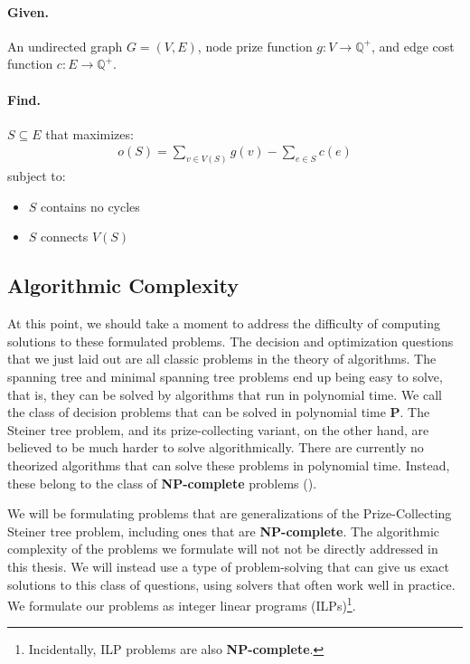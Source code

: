 \documentclass[12pt,twoside]{reedthesis}
\theoremstyle{definition}
\begin{document}
  \hfill\begin{minipage}{\dimexpr\textwidth-2cm}
  \paragraph{Given.}An undirected graph $G=(V,E)$, node prize function $g:V \rightarrow \mathbb{Q}^+$, and edge cost function $c:E \rightarrow \mathbb{Q}^+$.
  \paragraph{Find.}$S \subseteq E$ that maximizes:
  \begin{align*}
   o(S) = \sum_{v \in V(S)}g(v) - \sum_{e \in S}c(e)
  \end{align*}
  subject to:
  \begin{itemize}
    \item{$S$ contains no cycles}
    \item{$S$ connects $V(S)$}
  \end{itemize}
\xdef\tpd{\the\prevdepth}
\end{minipage}

\subsection{Algorithmic Complexity}
At this point, we should take a moment to address the difficulty of computing solutions to these formulated problems. The decision and optimization questions that we just laid out are all classic problems in the theory of algorithms. The spanning tree and minimal spanning tree problems end up being easy to solve, that is, they can be solved by algorithms that run in polynomial time. We call the class of decision problems that can be solved in polynomial time \textbf{P}. The Steiner tree problem, and its prize-collecting variant, on the other hand, are believed to be much harder to solve algorithmically. There are currently no theorized algorithms that can solve these problems in polynomial time. Instead, these belong to the class of \textbf{NP-complete} problems (\cite{Garey1979}).\par

We will be formulating problems that are generalizations of the Prize-Collecting Steiner tree problem, including ones that are \textbf{NP-complete}. The algorithmic complexity of the problems we formulate will not not be directly addressed in this thesis. We will instead use a type of problem-solving that can give us exact solutions to this class of questions, using solvers that often work well in practice. We formulate our problems as integer linear programs (ILPs)\footnote{Incidentally, ILP problems are also \textbf{NP-complete}.}.
\end{document}
